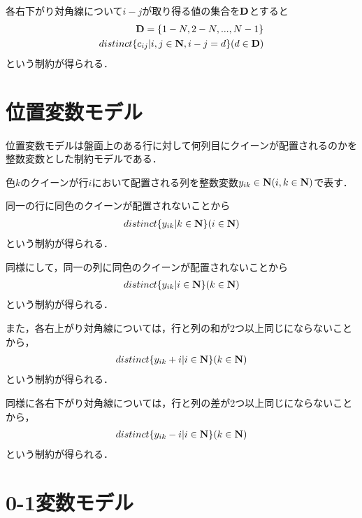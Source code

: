 各右下がり対角線について$i-j$が取り得る値の集合を$\bf D$とすると
\begin{eqnarray*}
    {\bf D} = \{1-N,2-N,...,N-1\} \\
    distinct\{c_{ij} | i,j \in {\bf N}, i-j=d \} (d \in {\bf D})
\end{eqnarray*}
という制約が得られる．

\section{位置変数モデル}
位置変数モデルは盤面上のある行に対して何列目にクイーンが配置されるのかを整数変数とした制約モデルである．

色$k$のクイーンが行$i$において配置される列を整数変数$y_{ik} \in {\bf N} (i,k \in {\bf N})$で表す．

同一の行に同色のクイーンが配置されないことから
\begin{eqnarray*}
    distinct\{y_{ik} | k \in {\bf N} \} (i \in {\bf N})
\end{eqnarray*}
という制約が得られる．

同様にして，同一の列に同色のクイーンが配置されないことから
\begin{eqnarray*}
    distinct\{y_{ik} | i \in {\bf N} \} (k \in {\bf N})
\end{eqnarray*}
という制約が得られる．

また，各右上がり対角線については，行と列の和が2つ以上同じにならないことから，
\begin{eqnarray*}
    distinct\{y_{ik}+i | i \in {\bf N} \} (k \in {\bf N})
\end{eqnarray*}
という制約が得られる．

同様に各右下がり対角線については，行と列の差が2つ以上同じにならないことから，
\begin{eqnarray*}
    distinct\{y_{ik}-i | i \in {\bf N} \} (k \in {\bf N})
\end{eqnarray*}
という制約が得られる．


\section{0-1変数モデル}


